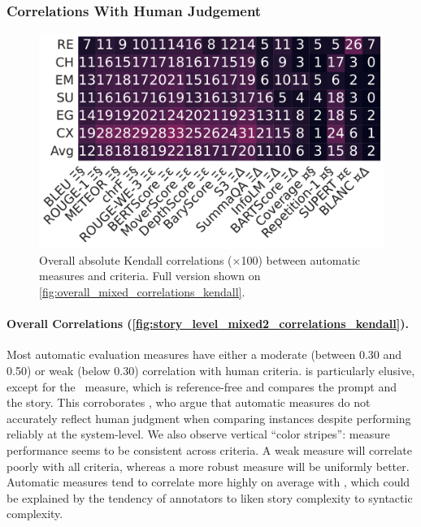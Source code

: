 \subsubsection{Correlations With Human Judgement}

\begin{figure}[!ht]
\centering
\includegraphics[width=\columnwidth]{pictures/mixed_filtered_story_kendall.pdf}
\caption{Overall absolute Kendall correlations ($\times$100) between automatic measures and criteria. Full version shown on \autoref{fig:overall_mixed_correlations_kendall}.}
\label{fig:story_level_mixed2_correlations_kendall}
\end{figure}

\paragraph{Overall Correlations (\autoref{fig:story_level_mixed2_correlations_kendall}).}
Most automatic evaluation measures have either a moderate (between 0.30 and 0.50) or weak (below 0.30) correlation with human criteria. {\myre} is particularly elusive, except for the \supert\ measure, which is reference-free and compares the prompt and the story. This corroborates \citet{novikova2017we}, who argue that automatic measures do not accurately reflect human judgment when comparing instances despite performing reliably at the system-level. We also observe vertical ``color stripes'': measure performance seems to be consistent across criteria. A weak measure will correlate poorly with all criteria, whereas a more robust measure will be uniformly better. Automatic measures tend to correlate more highly on average with {\mycx}, which could be explained by the tendency of annotators to liken story complexity to syntactic complexity.
    
